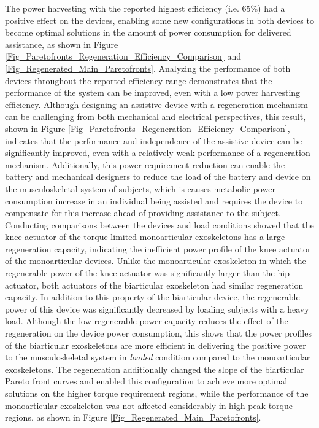 \documentclass[10pt,letterpaper]{article}
\begin{document}
The power harvesting with the reported highest efficiency (i.e. 65\%) had a positive effect on the devices, enabling some new configurations in both devices to become optimal solutions in the amount of power consumption for delivered assistance, as shown in Figure \ref{Fig_Paretofronts_Regeneration_Efficiency_Comparison} and \ref{Fig_Regenerated_Main_Paretofronts}. Analyzing the performance of both devices throughout the reported efficiency range demonstrates that the performance of the system can be improved, even with a low power harvesting efficiency. Although designing an assistive device with a regeneration mechanism can be challenging from both mechanical and electrical perspectives, this result, shown in Figure \ref{Fig_Paretofronts_Regeneration_Efficiency_Comparison}, indicates that the performance and independence of the assistive device can be significantly improved, even with a relatively weak performance of a regeneration mechanism. Additionally, this power requirement reduction can enable the battery and mechanical designers to reduce the load of the battery and  device on the musculoskeletal system of subjects, which is causes metabolic power consumption increase in an individual being assisted and requires the device to compensate for this increase ahead of providing assistance to the subject.\\
Conducting comparisons between the devices and load conditions showed that the knee actuator of the torque limited monoarticular exoskeletons has a large regeneration capacity, indicating the inefficient power profile of the knee actuator of the monoarticular devices. Unlike the monoarticular exoskeleton in which the regenerable power of the knee actuator was significantly larger than the hip actuator, both actuators of the biarticular exoskeleton had similar regeneration capacity. In addition to this property of the biarticular device, the regenerable power of this device was significantly decreased by loading subjects with a heavy load. Although the low regenerable power capacity reduces the effect of the regeneration on the device power consumption, this shows that the power profiles of the biarticular exoskeletons are more efficient in delivering the positive power to the musculoskeletal system in {\it loaded} condition compared to the monoarticular exoskeletons. The regeneration additionally changed the slope of the biarticular Pareto front curves and enabled this configuration to achieve more optimal solutions on the higher torque requirement regions, while the performance of the monoarticular exoskeleton was not affected considerably in high peak torque regions, as shown in Figure \ref{Fig_Regenerated_Main_Paretofronts}.\\
\end{document}
